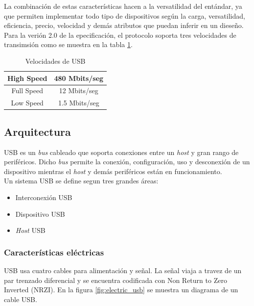 La combinaci\'on de estas caracter\'isticas hacen a la versatilidad del
ent\'andar, ya que permiten implementar todo tipo de dispositivos seg\'un la
carga, versatilidad, eficiencia, precio, velocidad y dem\'as atributos que
puedan inferir en un diese\~no.\\

Para la veri\'on 2.0 de la epecificaci\'on, el protocolo soporta tres
velocidades de transimsi\'on como se muestra en la
tabla \ref{tab:velocidad_usb}.

\begin{table}[ht]
\centering
\begin{tabular}{|c|c|}        \hline
High Speed & 480 Mbits/seg \\ \hline 
Full Speed & 12 Mbits/seg  \\ \hline
Low Speed & 1.5 Mbits/seg  \\ \hline
\end{tabular}
\caption{Velocidades de USB} 
\label{tab:velocidad_usb}
\end{table}

\subsection{Arquitectura}

USB es un \emph{bus} cableado que soporta conexiones entre un \emph{host} y
gran rango de perif\'ericos. Dicho \emph{bus} permite la conexi\'on,
configuraci\'on, uso y desconexi\'on de un dispositivo mientras el \emph{host}
y dem\'as perif\'ericos est\'an en funcionamiento. \\

Un sistema USB se  define segun tres grandes \'areas:

\begin{itemize}
 \item Interconexi\'on USB
 \item Dispositivo USB
 \item \emph{Host} USB
\end{itemize}

\subsubsection{Caracter\'isticas el\'ectricas}

USB usa cuatro cables para alimentaci\'on y se\~nal. La se\~nal viaja a travez
de un par trenzado diferencial y se encuentra codificada con Non Return to Zero
Inverted (NRZI). En la figura \ref{fig:electric_usb} se muestra un diagrama de
un cable
USB.


